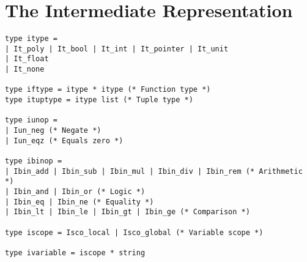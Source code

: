 \documentclass[12pt,twoside,notitlepage]{report}
\begin{document}
\chapter{The Intermediate Representation}
\begin{verbatim}
type itype =
| It_poly | It_bool | It_int | It_pointer | It_unit
| It_float
| It_none

type iftype = itype * itype (* Function type *)
type ituptype = itype list (* Tuple type *)

type iunop =
| Iun_neg (* Negate *)
| Iun_eqz (* Equals zero *)

type ibinop =
| Ibin_add | Ibin_sub | Ibin_mul | Ibin_div | Ibin_rem (* Arithmetic *)
| Ibin_and | Ibin_or (* Logic *)
| Ibin_eq | Ibin_ne (* Equality *)
| Ibin_lt | Ibin_le | Ibin_gt | Ibin_ge (* Comparison *)

type iscope = Isco_local | Isco_global (* Variable scope *)

type ivariable = iscope * string


\end{verbatim}
\end{document}
